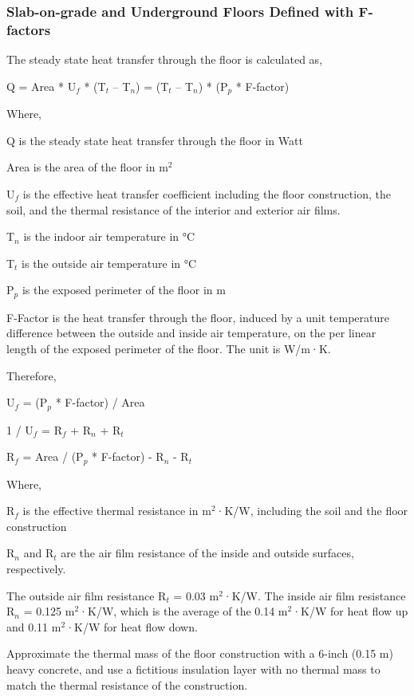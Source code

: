 \subsubsection{Slab-on-grade and Underground Floors Defined with F-factors}\label{slab-on-grade-and-underground-floors-defined-with-f-factors}

The steady state heat transfer through the floor is calculated as,

Q = Area * U\(_{f}\) * (T\(_{t}\) -- T\(_{n}\)) = (T\(_{t}\) -- T\(_{n}\)) * (P\(_{p}\) * F-factor)

Where,

Q is the steady state heat transfer through the floor in Watt

Area is the area of the floor in m\(^{2}\)

U\(_{f}\) is the effective heat transfer coefficient including the floor construction, the soil, and the thermal resistance of the interior and exterior air films.

T\(_{n}\) is the indoor air temperature in °C

T\(_{t}\) is the outside air temperature in °C

P\(_{p}\) is the exposed perimeter of the floor in m

F-Factor is the heat transfer through the floor, induced by a unit temperature difference between the outside and inside air temperature, on the per linear length of the exposed perimeter of the floor. The unit is W/m·K.

Therefore,

U\(_{f}\) = (P\(_{p}\) * F-factor) / Area

1 / U\(_{f}\) = R\(_{f}\) + R\(_{n}\) + R\(_{t}\)

R\(_{f}\) = Area / (P\(_{p}\) * F-factor) - R\(_{n}\) - R\(_{t}\)

Where,

R\(_{f}\) is the effective thermal resistance in m\(^{2}\)·K/W, including the soil and the floor construction

R\(_{n}\) and R\(_{t}\) are the air film resistance of the inside and outside surfaces, respectively.

The outside air film resistance R\(_{t}\) = 0.03 m\(^{2}\)·K/W. The inside air film resistance R\(_{n}\) = 0.125 m\(^{2}\)·K/W, which is the average of the 0.14 m\(^{2}\)·K/W for heat flow up and 0.11 m\(^{2}\)·K/W for heat flow down.

Approximate the thermal mass of the floor construction with a 6-inch (0.15 m) heavy concrete, and use a fictitious insulation layer with no thermal mass to match the thermal resistance of the construction.

